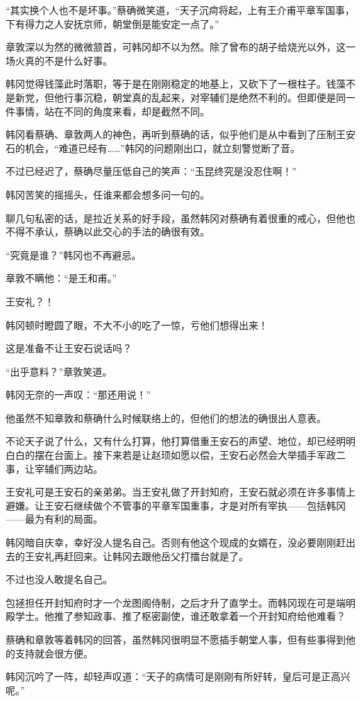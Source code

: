 “其实换个人也不是坏事。”蔡确微笑道，“天子沉疴将起，上有王介甫平章军国事，下有得力之人安抚京师，朝堂倒是能安定一点了。”

章敦深以为然的微微颔首，可韩冈却不以为然。除了曾布的胡子给烧光以外，这一场火真的不是什么好事。

韩冈觉得钱藻此时落职，等于是在刚刚稳定的地基上，又砍下了一根柱子。钱藻不是新党，但他行事沉稳，朝堂真的乱起来，对宰辅们是绝然不利的。但即便是同一件事情，站在不同的角度来看，却是截然不同。

韩冈看蔡确、章敦两人的神色，再听到蔡确的话，似乎他们是从中看到了压制王安石的机会，“难道已经有……”韩冈的问题刚出口，就立刻警觉断了音。

不过已经迟了，蔡确尽量压低自己的笑声：“玉昆终究是没忍住啊！”

韩冈苦笑的摇摇头，任谁来都会想多问一句的。

聊几句私密的话，是拉近关系的好手段，虽然韩冈对蔡确有着很重的戒心，但他也不得不承认，蔡确以此交心的手法的确很有效。

“究竟是谁？”韩冈也不再避忌。

章敦不瞒他：“是王和甫。”

王安礼？！

韩冈顿时瞪圆了眼，不大不小的吃了一惊，亏他们想得出来！

这是准备不让王安石说话吗？

“出乎意料？”章敦笑道。

韩冈无奈的一声叹：“那还用说！”

他虽然不知章敦和蔡确什么时候联络上的，但他们的想法的确很出人意表。

不论天子说了什么，又有什么打算，他打算借重王安石的声望、地位，却已经明明白白的摆在台面上。接下来若是让赵顼如愿以偿，王安石必然会大举插手军政二事，让宰辅们两边站。

王安礼可是王安石的亲弟弟。当王安礼做了开封知府，王安石就必须在许多事情上避嫌。让王安石继续做个不管事的平章军国重事，才是对所有宰执——包括韩冈——最为有利的局面。

韩冈暗自庆幸，幸好没人提名自己。否则有他这个现成的女婿在，没必要刚刚赶出去的王安礼再赶回来。让韩冈去跟他岳父打擂台就是了。

不过也没人敢提名自己。

包拯担任开封知府时才一个龙图阁侍制，之后才升了直学士。而韩冈现在可是端明殿学士。他推了参知政事、推了枢密副使，谁还敢拿着一个开封知府给他难看？

蔡确和章敦等着韩冈的回答，虽然韩冈很明显不愿插手朝堂人事，但有些事得到他的支持就会很方便。

韩冈沉吟了一阵，却轻声叹道：“天子的病情可是刚刚有所好转，皇后可是正高兴呢。”

